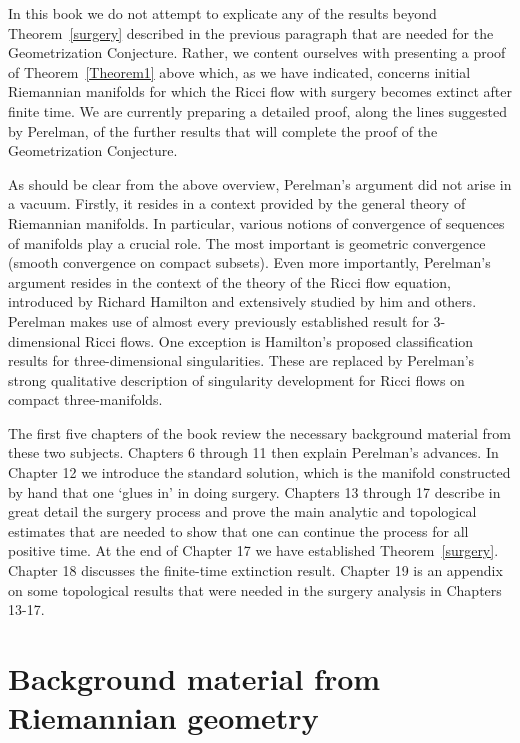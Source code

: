 In this book we do not attempt to explicate any of the results
beyond Theorem~\ref{surgery} described in the previous paragraph
that are needed for the Geometrization Conjecture. Rather, we
content ourselves with presenting a proof of Theorem~\ref{Theorem1}
above which, as we have indicated, concerns initial Riemannian
manifolds for which the Ricci flow with surgery becomes extinct
after finite time. We are currently preparing a detailed proof,
along the lines suggested by Perelman, of the further results that
will complete the proof of the Geometrization Conjecture.





As should be clear from the above overview, Perelman's argument did
not arise in a vacuum. Firstly, it resides in a context provided by
the general theory of Riemannian manifolds. In particular,  various
notions of convergence of sequences of manifolds play a crucial
role. The most important is geometric convergence (smooth
convergence on compact subsets). Even more importantly, Perelman's
argument resides in the context of the theory of the Ricci flow
equation, introduced by Richard Hamilton and extensively studied by
him and others. Perelman makes use of almost every previously
established result for $3$-dimensional Ricci flows. One exception is
Hamilton's  proposed classification results for three-dimensional
singularities. These are replaced by Perelman's strong qualitative
description of singularity development for Ricci flows on compact
three-manifolds.

The first five chapters of the book review the necessary background
material from these two subjects. Chapters 6 through 11 then explain
Perelman's advances. In Chapter 12 we introduce the standard
solution, which is the manifold
constructed by hand that one `glues in' in doing surgery. Chapters
13 through 17 describe in great detail the surgery process and prove
the main analytic and topological estimates that are needed to show
that one can continue the process for all positive time. At the end
of Chapter 17 we have established Theorem~\ref{surgery}. Chapter 18
discusses the finite-time extinction result. Chapter 19 is an
appendix on some topological results that were needed in the surgery
analysis in Chapters 13-17.

\section{Background material from Riemannian geometry}

